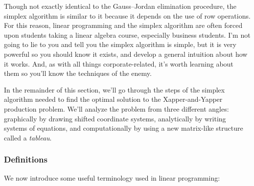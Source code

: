 \documentclass[11pt,oneside]{article}
\begin{document}
	
	\noindent
	Though not exactly identical to the Gauss--Jordan elimination procedure,
	the simplex algorithm is similar to it because it depends on the use of row operations.
	For this reason, linear programming and the simplex algorithm are often forced upon
	students taking a linear algebra course, especially business students.	
	I'm not going to lie to you and tell you the simplex algorithm is simple,
	but it is very powerful so you should know it exists, 
	and develop a general intuition about how it works.
	And, as with all things corporate-related,
	it's worth learning about them so you'll know the techniques of the enemy.

	In the remainder of this section, we'll go through the steps of the simplex algorithm 
	needed to find the optimal solution to the Xapper-and-Yapper production problem.
	We'll analyze the problem from three different angles: 
	graphically by drawing shifted coordinate systems,
	analytically by writing systems of equations, 
	and computationally by using a new matrix-like structure called a \emph{tableau}.
	
	
	\subsubsection{Definitions}
		
		We now introduce some useful terminology used in linear programming:
		
\end{document}
